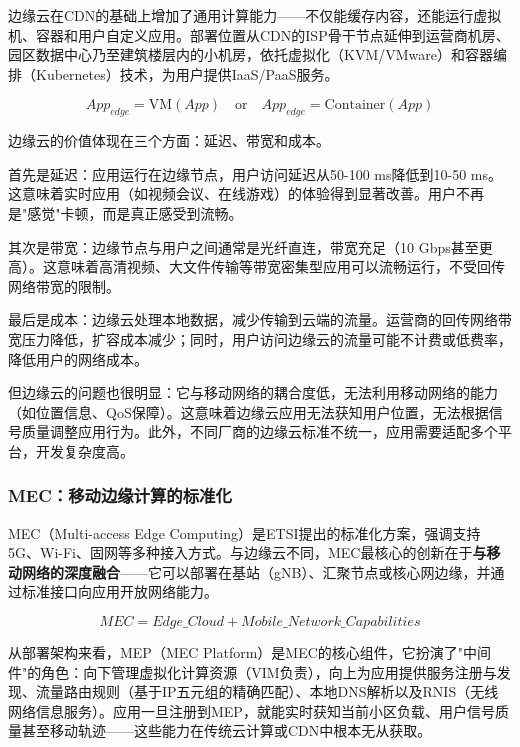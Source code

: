 边缘云在CDN的基础上增加了通用计算能力——不仅能缓存内容，还能运行虚拟机、容器和用户自定义应用。部署位置从CDN的ISP骨干节点延伸到运营商机房、园区数据中心乃至建筑楼层内的小机房，依托虚拟化（KVM/VMware）和容器编排（Kubernetes）技术，为用户提供IaaS/PaaS服务。

\begin{equation}
App_{edge} = \text{VM}(App) \quad \text{or} \quad App_{edge} = \text{Container}(App)
\end{equation}

边缘云的价值体现在三个方面：延迟、带宽和成本。

首先是延迟：应用运行在边缘节点，用户访问延迟从50-100 ms降低到10-50 ms。这意味着实时应用（如视频会议、在线游戏）的体验得到显著改善。用户不再是"感觉"卡顿，而是真正感受到流畅。

其次是带宽：边缘节点与用户之间通常是光纤直连，带宽充足（10 Gbps甚至更高）。这意味着高清视频、大文件传输等带宽密集型应用可以流畅运行，不受回传网络带宽的限制。

最后是成本：边缘云处理本地数据，减少传输到云端的流量。运营商的回传网络带宽压力降低，扩容成本减少；同时，用户访问边缘云的流量可能不计费或低费率，降低用户的网络成本。

但边缘云的问题也很明显：它与移动网络的耦合度低，无法利用移动网络的能力（如位置信息、QoS保障）。这意味着边缘云应用无法获知用户位置，无法根据信号质量调整应用行为。此外，不同厂商的边缘云标准不统一，应用需要适配多个平台，开发复杂度高。

\subsubsection{MEC：移动边缘计算的标准化}

MEC（Multi-access Edge Computing）是ETSI提出的标准化方案，强调支持5G、Wi-Fi、固网等多种接入方式。与边缘云不同，MEC最核心的创新在于\textbf{与移动网络的深度融合}——它可以部署在基站（gNB）、汇聚节点或核心网边缘，并通过标准接口向应用开放网络能力。

\begin{equation}
MEC = Edge\_Cloud + Mobile\_Network\_Capabilities
\end{equation}

从部署架构来看，MEP（MEC Platform）是MEC的核心组件，它扮演了"中间件"的角色：向下管理虚拟化计算资源（VIM负责），向上为应用提供服务注册与发现、流量路由规则（基于IP五元组的精确匹配）、本地DNS解析以及RNIS（无线网络信息服务）。应用一旦注册到MEP，就能实时获知当前小区负载、用户信号质量甚至移动轨迹——这些能力在传统云计算或CDN中根本无从获取。

